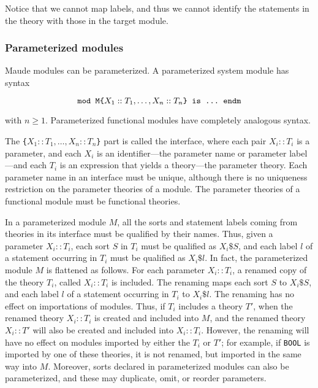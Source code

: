 Notice that we cannot map labels, and thus we cannot identify the statements in
the theory with those in the target module.

\subsubsection{Parameterized modules}\label{subsec:pmod}

Maude modules can be parameterized. A parameterized
system module has syntax

$$
\verb"mod M{" X_1 :: T_1 , \ldots , X_n :: T_n \verb"} is ... endm"
$$

\noindent with $n \geq 1$. Parameterized functional modules have completely
analogous syntax.

The \verb"{"$X_1 :: T_1 , \ldots , X_n :: T_n$\verb"}" part is called the
interface, where each pair $X_i :: T_i$ is a parameter, and each $X_i$ is an
identifier---the parameter name or parameter label---and each $T_i$ is
an expression that yields a theory---the parameter theory. Each parameter
name in an interface must be unique, although there is no uniqueness
restriction on the parameter theories of a module. The parameter theories
of a functional module must be functional theories.

In a parameterized module $M$, all the sorts and statement labels
coming from theories in its interface must be qualified by their names. Thus,
given a parameter $X_i :: T_i$, each sort $S$ in $T_i$ must be
qualified as $X_i\texttt{\$}S$, and each label $l$ of a statement occurring in
$T_i$ must be qualified as $X_i\texttt{\$}l$. In fact, the parameterized module
$M$ is flattened as follows. For each parameter $X_i :: T_i$, 
a renamed copy of the theory $T_i$, called $X_i :: T_i$ is included.
The renaming  maps each sort $S$ to $X_i\texttt{\$}S$, and each label $l$
of a statement occurring in $T_i$ to $X_i\texttt{\$}l$. The renaming has
no effect on importations of modules. Thus, if $T_i$ includes a theory $T'$,
when the renamed
theory $X_i :: T_i$ is created and included into $M$, and the renamed
theory $X_i :: T'$ will also be created and included into $X_i :: T_i$. 
However, the renaming will have no effect on modules imported by either the
$T_i$ or $T'$; for example, if \verb"BOOL" is imported by one of these
theories, it is not renamed, but imported in the same way into $M$.
%
Moreover, sorts declared in parameterized modules can also be parameterized,
and these may duplicate, omit, or reorder parameters.

